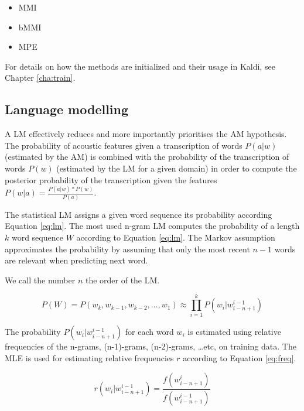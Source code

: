 \begin{itemize}
\item \acl{MMI}\cite{chow1990maximum} %
\item \acl{bMMI}\cite{povey2008boosted}
\item \acl{MPE}\cite{povey2003mmi}
\end{itemize}

For details on how the methods are initialized and their usage in Kaldi, see Chapter \ref{cha:train}.

\subsection{Language modelling}
\label{sub:lm}

A \acl{LM} effectively reduces and more importantly prioritises the \ac{AM} hypothesis. The probability of acoustic features given a transcription of words $P(a|w)$ (estimated by the \ac{AM}) is combined with the probability of the transcription of words $P(w)$ (estimated by the \ac{LM} for a given domain) in order to compute the posterior probability of the transcription given the features $P(w|a) = \frac{P(a|w)*P(w)}{P(a)}$.

The statistical \ac{LM} assigns a given word sequence its probability according Equation \ref{eq:lm}. The most used n-gram \ac{LM} computes the probability of a length $k$ word sequence $W$ according to Equation \ref{eq:lm}.\cite{brants2007large} The Markov assumption approximates the probability by assuming that only the most recent $n-1$ words are relevant when predicting next word.


We call the number $n$ the order of the \ac{LM}.

\begin{equation} \label{eq:lm}
  P(W)=P(w_k,  w_{k-1}, w_{k-2}, ..., w_1) \approx \prod_{i=1}^{k}{P(w_i|w^{i-1}_{i-n+1})}
\end{equation}

The probability $P(w_i|w^{i-1}_{i-n+1})$ for each word $w_i$ is estimated using relative frequencies of the n-grams, (n-1)-grams, (n-2)-grams, \ldots etc, on training data. The \ac{MLE} is used for estimating relative frequencies $r$ according to Equation \ref{eq:freq}.

\begin{equation} \label{eq:freq}
  r(w_i|w^{i-1}_{i-n+1}) = \frac{f(w^i_{i-n+1})}{f(w^{i-1}_{i-n+1})}
\end{equation}

